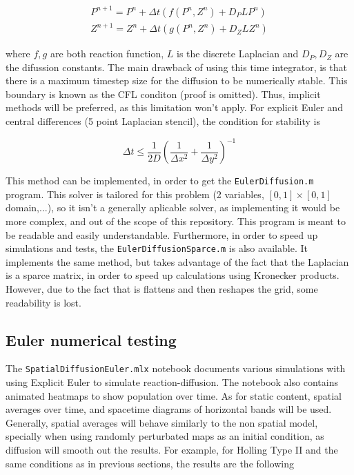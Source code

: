 \documentclass[11pt,oneside,parskip=half]{scrbook}  %
\begin{document}
$$
\begin{matrix}
P^{n+1}=P^n+\Delta t(f(P^n,Z^n)+D_PLP^n) \\
Z^{n+1}=Z^n+\Delta t(g(P^n,Z^n)+D_ZLZ^n)
\end{matrix}
$$

where $f,g$ are both reaction function, $L$ is the discrete Laplacian and $D_P,D_Z$ are the difussion constants. The main drawback of using this time integrator, is that there is a maximum timestep size for the diffusion to be numerically stable. This boundary is known as the CFL conditon (proof is omitted). Thus, implicit methods will be preferred, as this limitation won't apply. For explicit Euler and central differences (5 point Laplacian stencil), the condition for stability is

$$
\Delta t\le \frac1{2D}\left(\frac1{\Delta x^2}+\frac1{\Delta y^2}\right)^{-1}
$$

This method can be implemented, in order to get the \texttt{EulerDiffusion.m} program. This solver is tailored for this problem (2 variables, $[0,1]\times[0,1]$ domain,...), so it isn't a generally aplicable solver, as implementing it would be more complex, and out of the scope of this repository. This program is meant to be readable and easily understandable. Furthermore, in order to speed up simulations and tests, the \texttt{EulerDiffusionSparce.m} is also available. It implements the same method, but takes advantage of the fact that the Laplacian is a sparce matrix, in order to speed up calculations using Kronecker products. However, due to the fact that is flattens and then reshapes the grid, some readability is lost.

\subsection{Euler numerical testing}

The \texttt{SpatialDiffusionEuler.mlx} notebook documents various simulations with using Explicit Euler to simulate reaction-diffusion. The notebook also contains animated heatmaps to show population over time. As for static content, spatial averages over time, and spacetime diagrams of horizontal bands will be used. Generally, spatial averages will behave similarly to the non spatial model, specially when using randomly perturbated maps as an initial condition, as diffusion will smooth out the results. For example, for Holling Type II and the same conditions as in previous sections, the results are the following
\end{document}
